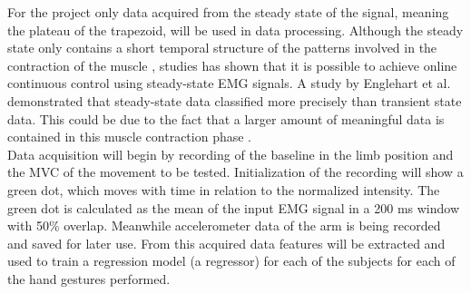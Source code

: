 For the project only data acquired from the steady state of the signal, meaning the plateau of the trapezoid, will be used in data processing. Although the steady state only contains a short temporal structure of the patterns involved in the contraction of the muscle \cite{mobarak2014}, studies has shown that it is possible to achieve online continuous control using steady-state EMG signals. A study by Englehart et al. \cite{englehart2001} demonstrated that steady-state data classified more precisely than transient state data. This could be due to the fact that a larger amount of meaningful data is contained in this muscle contraction phase \cite{mobarakm2014}. \\
Data acquisition will begin by recording of the baseline in the limb position and the MVC of the movement to be tested. Initialization of the recording will show a green dot, which moves with time in relation to the normalized intensity. The green dot is calculated as the mean of the input EMG signal in a 200 ms window with 50\% overlap. Meanwhile accelerometer data of the arm is being recorded and saved for later use. %
From this acquired data features will be extracted and used to train a regression model (a regressor) for each of the subjects for each of the hand gestures performed.



